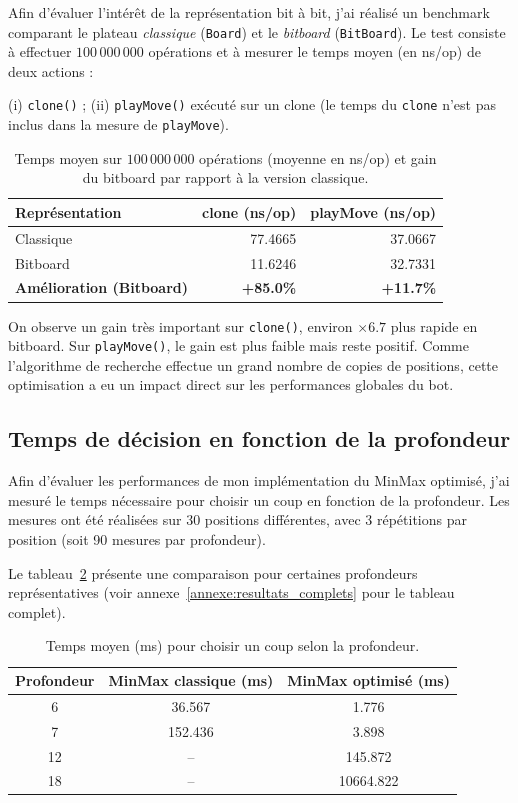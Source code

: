 \documentclass[11pt,a4paper]{article}
\begin{document}
Afin d'évaluer l'intérêt de la représentation bit à bit, j'ai réalisé un benchmark comparant le plateau \textit{classique}
(\texttt{Board}) et le \textit{bitboard} (\texttt{BitBoard}). Le test consiste à effectuer $100\,000\,000$ opérations et à mesurer
le temps moyen (en ns/op) de deux actions :

(i) \texttt{clone()} ; (ii) \texttt{playMove()} exécuté sur un clone (le temps du \texttt{clone} n'est pas inclus dans la mesure
de \texttt{playMove}).

\begin{table}[h]
\centering
\begin{tabular}{|l|r|r|}
\hline
\textbf{Représentation} & \textbf{clone (ns/op)} & \textbf{playMove (ns/op)} \\
\hline
Classique & 77.4665 & 37.0667 \\
Bitboard  & 11.6246 & 32.7331 \\
\hline
\textbf{Amélioration (Bitboard)} & \textbf{+85.0\%} & \textbf{+11.7\%} \\
\hline
\end{tabular}
\caption{Temps moyen sur $100\,000\,000$ opérations (moyenne en ns/op) et gain du bitboard par rapport à la version classique.}
\label{tab:bench_bitboard}
\end{table}

On observe un gain très important sur \texttt{clone()}, environ $\times 6.7$ plus rapide en bitboard. Sur \texttt{playMove()}, le gain
est plus faible mais reste positif. Comme l'algorithme de recherche effectue un grand nombre de copies de positions, cette optimisation
a eu un impact direct sur les performances globales du bot.

\subsection{Temps de décision en fonction de la profondeur}

Afin d'évaluer les performances de mon implémentation du MinMax optimisé, j'ai mesuré le temps nécessaire pour choisir un coup en
fonction de la profondeur. Les mesures ont été réalisées sur 30 positions différentes, avec 3 répétitions par position (soit 90 mesures
par profondeur).

Le tableau~\ref{tab:depth_compare} présente une comparaison pour certaines profondeurs représentatives (voir annexe~\ref{annexe:resultats_complets} pour le tableau complet).

\begin{table}[h]
\centering
\begin{tabular}{|c|c|c|}
\hline
\textbf{Profondeur} & \textbf{MinMax classique (ms)} & \textbf{MinMax optimisé (ms)} \\
\hline
6  & 36.567  & 1.776 \\
7  & 152.436 & 3.898 \\
12 & --      & 145.872 \\
18 & --      & 10664.822 \\
\hline
\end{tabular}
\caption{Temps moyen (ms) pour choisir un coup selon la profondeur.}
\label{tab:depth_compare}
\end{table}
\end{document}
